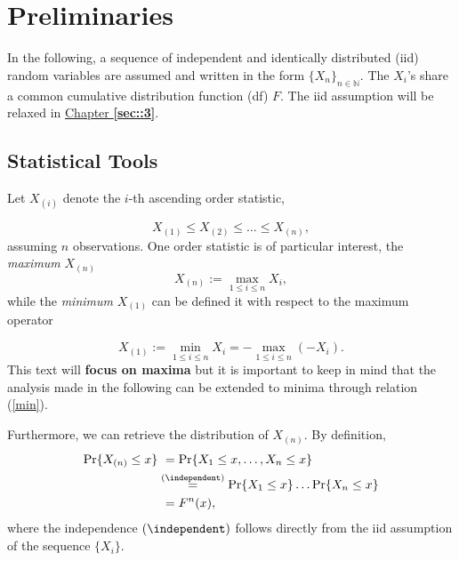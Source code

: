 
\section{Preliminaries}\label{sec::1.1}


In the following, a sequence of independent and identically distributed (iid) random variables are assumed and written in the form $\{X_n\}_{n\in\mathbb{N}}$. The $X_i$'s share a common cumulative distribution function (df) $F$. The iid assumption will be relaxed in \hyperref[sec::3]{Chapter \textbf{\ref{sec::3}}}.


\subsection*{Statistical Tools}

Let $X_{(i)} $ denote the $i$-th ascending order statistic,

\begin{equation} \label{ordereds}
X_{(1)}\leq X_{(2)}\leq \ldots \leq X_{(n)},
\end{equation}
assuming $n$ observations.
One order statistic is of particular interest, the \emph{maximum} $X_{(n)}$
\begin{equation} \label{max}
X_{(n)}:=\displaystyle{\max_{1\leq i\leq n}}X_i,
\end{equation}
while the \emph{minimum} $X_{(1)}$ can be defined it with respect to the maximum operator

\begin{equation}\label{min}
X_{(1)}:=\displaystyle{\min_{1\leq i\leq n}}X_i=- \displaystyle{\max_{1\leq i\leq n}}(-X_i).
\end{equation}
This text will \textbf{focus on maxima} but it is important to keep in mind that the analysis made in the following can be extended to minima through relation (\ref{min}).

Furthermore, we can retrieve the distribution of $X_{(n)}$. By definition,
\begin{equation}\label{maxdist}
\begin{aligned}
\text{Pr}\{X_{(n)}\leq x\} & \ =\text{Pr}\{X_1 \leq x, \ldots, X_n \leq x\} \\ &\stackrel{(\independent)}{=}\text{Pr}\{X_1\leq x\}\dots\text{Pr}\{X_n\leq x\} \\
&\ =F^n(x),
\end{aligned}
\end{equation}
where the independence $(\independent)$  follows directly from the iid assumption of the sequence $\{X_i\}$.


